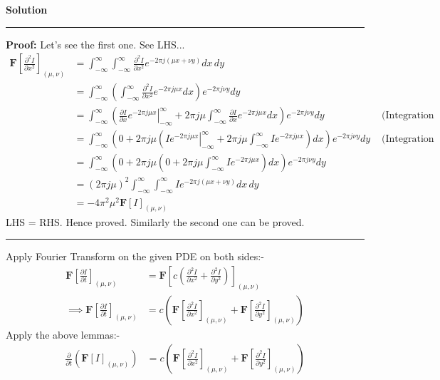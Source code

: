 \documentclass[a4paper]{article}
\newenvironment{solution}[2][]{%
    \begin{mdframed}[linecolor=green!60!black, linewidth=2pt, roundcorner=10pt, backgroundcolor=green!5!white, skipabove=12pt, skipbelow=12pt]%
        \textbf{\large #2} %
        \par\noindent\rule{\textwidth}{0.4pt} %
        \vspace{0.5em} %
}{%
    \end{mdframed}%
}
\begin{document}
\begin{solution}{Solution}
	\textbf{Proof:} Let's see the first one. See LHS...
	\begin{align*}
		\mathbf{F} \left[\frac{\partial^2 I}{\partial x^2}\right]_{(\mu ,\nu)} &= \int_{- \infty}^{\infty} \int_{- \infty}^{\infty} \frac{\partial^2 I}{\partial x^2} e^{-2 \pi j (\mu x + \nu y)} dx \, dy \\
		&= \int_{- \infty}^{\infty} \left( \int_{- \infty}^{\infty} \frac{\partial^2 I}{\partial x^2} e^{-2 \pi j \mu x} dx \right) e^{-2 \pi j \nu y} dy \\
		&= \int_{- \infty}^{\infty} \left( \left. \frac{\partial I}{\partial x} e^{-2 \pi j \mu x} \right|_{- \infty}^{\infty} + 2 \pi j \mu \int_{- \infty}^{\infty} \frac{\partial I}{\partial x} e^{-2 \pi j \mu x} dx \right) e^{-2 \pi j \nu y} dy &\text{ (Integration by parts)} \\
		&= \int_{- \infty}^{\infty} \left( 0 + 2 \pi j \mu \left( \left. I e^{-2 \pi j \mu x} \right|_{- \infty}^{\infty} + 2 \pi j \mu \int_{- \infty}^{\infty} I e^{-2 \pi j \mu x} \right) dx \right) e^{-2 \pi j \nu y} dy &\text{ (Integration by parts)} \\
		&= \int_{- \infty}^{\infty} \left( 0 + 2 \pi j \mu \left( 0 + 2 \pi j \mu \int_{- \infty}^{\infty} I e^{-2 \pi j \mu x} \right) dx \right) e^{-2 \pi j \nu y} dy \\
		&= (2 \pi j \mu)^2 \int_{- \infty}^{\infty} \int_{- \infty}^{\infty} I e^{-2 \pi j (\mu x + \nu y)} dx \, dy \\
		&= -4 \pi^2 \mu^2 \mathbf{F}[I]_{(\mu ,\nu)}
	\end{align*}
	LHS = RHS. Hence proved. Similarly the second one can be proved.
	\vspace{5pt}
	\hrule
	\vspace{5pt}
	Apply Fourier Transform on the given PDE on both sides:-
	\begin{align*}
		\mathbf{F} \left[\frac{\partial I}{\partial t} \right]_{(\mu, \nu)} &= \mathbf{F} \left[c \left( \frac{\partial^2 I}{\partial x^2} + \frac{\partial^2 I}{\partial y^2} \right)\right]_{(\mu, \nu)} \\
		\implies \mathbf{F} \left[\frac{\partial I}{\partial t} \right]_{(\mu, \nu)} &= c \left( \mathbf{F} \left[\frac{\partial^2 I}{\partial x^2}\right]_{(\mu, \nu)} + \mathbf{F} \left[\frac{\partial^2 I}{\partial y^2}\right]_{(\mu, \nu)} \right)
	\end{align*}
	Apply the above lemmas:-
	\begin{align*}
		\frac{\partial}{\partial t}(\mathbf{F} [I]_{(\mu, \nu)}) &= c \left( \mathbf{F} \left[\frac{\partial^2 I}{\partial x^2}\right]_{(\mu, \nu)} + \mathbf{F} \left[\frac{\partial^2 I}{\partial y^2}\right]_{(\mu, \nu)} \right) \\

\end{align*}
\end{solution}
\end{document}
